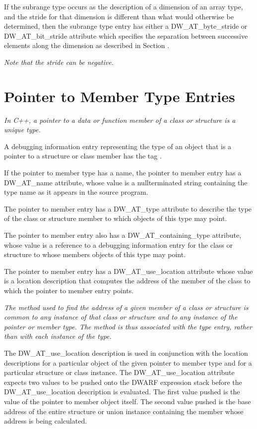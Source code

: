 If the subrange type occurs as the description of a dimension
of an array type, and the stride for that dimension is
different than what would otherwise be determined, then
the subrange type entry has either a DW\_AT\_byte\_stride or
DW\_AT\_bit\_stride attribute which specifies the separation
between successive elements along the dimension as described
in 
Section .

\textit{Note that the stride can be negative.}

\section{Pointer to Member Type Entries}
\label{chap:pointertomembertypeentries}

\textit{In C++, a pointer to a data or function member of a class or
structure is a unique type.}

A debugging information entry representing the type of an
object that is a pointer to a structure or class member has
the tag .

If the pointer to member type has a name, the pointer to
member entry has a DW\_AT\_name attribute, whose value is a
null\dash terminated string containing the type name as it appears
in the source program.

The pointer to member entry has a DW\_AT\_type attribute to
describe the type of the class or structure member to which
objects of this type may point.

The pointer to member entry also has a DW\_AT\_containing\_type
attribute, whose value is a reference to a debugging
information entry for the class or structure to whose members
objects of this type may point.

The pointer to member entry has a DW\_AT\_use\_location attribute
whose value is a location description that computes the
address of the member of the class to which the pointer to
member entry points.

\textit{The method used to find the address of a given member of a
class or structure is common to any instance of that class
or structure and to any instance of the pointer or member
type. The method is thus associated with the type entry,
rather than with each instance of the type.}

The DW\_AT\_use\_location description is used in conjunction
with the location descriptions for a particular object of the
given pointer to member type and for a particular structure or
class instance. The DW\_AT\_use\_location attribute expects two
values to be pushed onto the DWARF expression stack before
the DW\_AT\_use\_location description is evaluated. The first
value pushed is the value of the pointer to member object
itself. The second value pushed is the base address of the
entire structure or union instance containing the member
whose address is being calculated.

